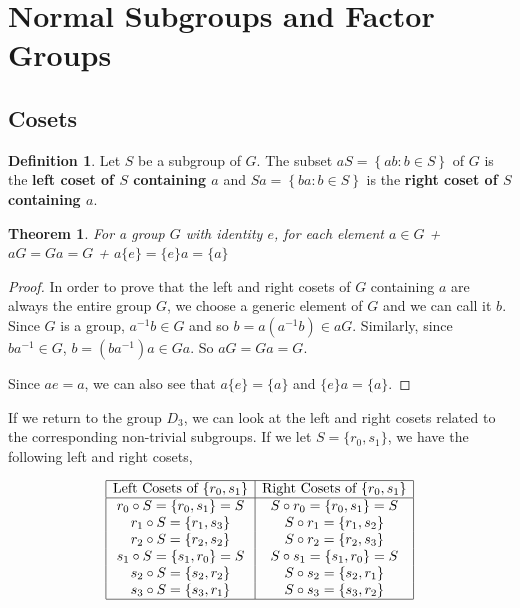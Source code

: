 \documentclass[
]{book}
\let\stdsection\section
\renewcommand\section{\newpage\stdsection}
\newtheorem{theorem}{Theorem}[chapter]
\theoremstyle{definition}
\newtheorem{definition}{Definition}[chapter]
\theoremstyle{definition}
\theoremstyle{definition}
\theoremstyle{definition}
\theoremstyle{remark}
\begin{document}
\hypertarget{normal-subgroups-and-factor-groups}{%
\section{Normal Subgroups and Factor Groups}\label{normal-subgroups-and-factor-groups}}

\hypertarget{cosets}{%
\subsection{Cosets}\label{cosets}}

\begin{definition}
Let \(S\) be a subgroup of \(G\). The subset \(aS = \left\{ a b: b\in S \right\}\) of \(G\) is the \textbf{left coset of \(S\) containing \(a\)} and \(Sa = \left\{ ba : b\in S \right\}\) is the \textbf{right coset of \(S\) containing \(a\)}.
\end{definition}

\begin{theorem}
For a group \(G\) with identity \(e\), for each element \(a\in G\)
+ \(aG=Ga=G\)
+ \(a\{e\}=\{e\} a=\{a\}\)
\end{theorem}

\begin{proof}
In order to prove that the left and right cosets of \(G\) containing \(a\) are always the entire group \(G\), we choose a generic element of \(G\) and we can call it \(b\). Since \(G\) is a group, \(a^{-1}b\in G\) and so \(b= a (a^{-1}b) \in aG\). Similarly, since \(ba^{-1}\in G\), \(b = (ba^{-1})a \in Ga\). So \(aG=Ga=G\).

Since \(ae=a\), we can also see that \(a\{e\} = \{a\}\) and \(\{e\}a=\{a\}\).
\end{proof}

If we return to the group \(D_3\), we can look at the left and right cosets related to the corresponding non-trivial subgroups. If we let \(S=\{r_0,s_1\}\), we have the following left and right cosets,

\[\begin{array}{|c|c|}
    \hline
    \mbox{Left Cosets of } \{r_0, s_1\} & \mbox{Right Cosets  of } \{r_0, s_1\}\\ \hline
    r_0 \circ S = \{r_0, s_1\} = S & S \circ r_0 = \{r_0, s_1\} = S \\
     r_1 \circ S = \{r_1, s_3\}  & S \circ r_1 = \{r_1, s_2\}  \\
     r_2 \circ S = \{r_2, s_2 \} & S \circ r_2 = \{r_2, s_3 \} \\
     s_1 \circ S = \{s_1, r_0\}=S & S \circ s_1 = \{s_1, r_0\} = S \\
     s_2 \circ S = \{s_2, r_2 \} & S \circ s_2 = \{s_2, r_1\}  \\
     s_3 \circ S = \{s_3, r_1\} & S \circ s_3 = \{s_3, r_2\}  \\ \hline
\end{array}\]
\end{document}
